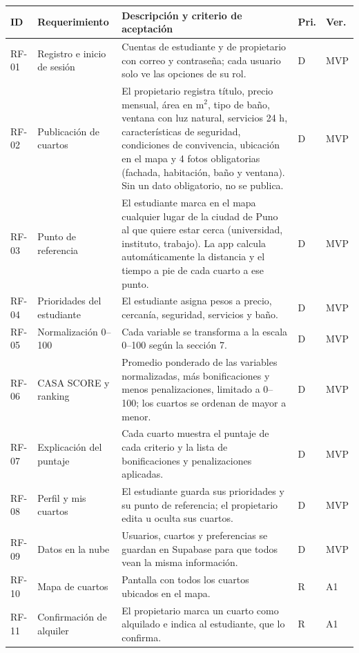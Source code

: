 \documentclass[11pt,a4paper]{article}
\begin{document}
\vspace{0.1cm}
{\small
\setlength{\tabcolsep}{4pt}
\noindent\begin{tabularx}{\textwidth}{@{}P{1.3cm} P{3.2cm} L C{0.6cm} C{0.9cm}@{}}
\toprule
{}
\textbf{ID} & \textbf{Requerimiento} & \textbf{Descripción y criterio de aceptación} & \textbf{Pri.} & \textbf{Ver.} \\
\midrule
RF-01 & Registro e inicio de sesión & Cuentas de estudiante y de propietario con correo y contraseña; cada usuario solo ve las opciones de su rol. & D & MVP \\
RF-02 & Publicación de cuartos & El propietario registra título, precio mensual, área en m$^2$, tipo de baño, ventana con luz natural, servicios 24 h, características de seguridad, condiciones de convivencia, ubicación en el mapa y 4 fotos obligatorias (fachada, habitación, baño y ventana). Sin un dato obligatorio, no se publica. & D & MVP \\
RF-03 & Punto de referencia & El estudiante marca en el mapa cualquier lugar de la ciudad de Puno al que quiere estar cerca (universidad, instituto, trabajo). La app calcula automáticamente la distancia y el tiempo a pie de cada cuarto a ese punto. & D & MVP \\
RF-04 & Prioridades del estudiante & El estudiante asigna pesos a precio, cercanía, seguridad, servicios y baño. & D & MVP \\
RF-05 & Normalización 0--100 & Cada variable se transforma a la escala 0--100 según la sección 7. & D & MVP \\
RF-06 & CASA SCORE y ranking & Promedio ponderado de las variables normalizadas, más bonificaciones y menos penalizaciones, limitado a 0--100; los cuartos se ordenan de mayor a menor. & D & MVP \\
RF-07 & Explicación del puntaje & Cada cuarto muestra el puntaje de cada criterio y la lista de bonificaciones y penalizaciones aplicadas. & D & MVP \\
RF-08 & Perfil y mis cuartos & El estudiante guarda sus prioridades y su punto de referencia; el propietario edita u oculta sus cuartos. & D & MVP \\
RF-09 & Datos en la nube & Usuarios, cuartos y preferencias se guardan en Supabase para que todos vean la misma información. & D & MVP \\
RF-10 & Mapa de cuartos & Pantalla con todos los cuartos ubicados en el mapa. & R & A1 \\
RF-11 & Confirmación de alquiler & El propietario marca un cuarto como alquilado e indica al estudiante, que lo confirma. & R & A1 \\

\end{tabularx}}
\end{document}
